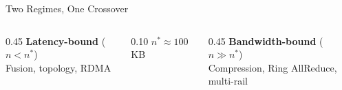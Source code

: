 \documentclass[aspectratio=169, 12pt]{beamer}
\begin{document}
\begin{frame}{Two Regimes, One Crossover}
\vspace{0.1cm}
\small
\begin{columns}[T]
  \begin{column}{0.45\textwidth}
    \centering
    \textcolor{errorstroke}{\textbf{Latency-bound}} ($n < n^*$)\\[0.05cm]
    {\scriptsize Fusion, topology, RDMA}
  \end{column}
  \begin{column}{0.10\textwidth}
    \centering
    {\footnotesize $n^* \!\approx\! 100$ KB}
  \end{column}
  \begin{column}{0.45\textwidth}
    \centering
    \textcolor{datastroke}{\textbf{Bandwidth-bound}} ($n \gg n^*$)\\[0.05cm]
    {\scriptsize Compression, Ring AllReduce, multi-rail}
  \end{column}
\end{columns}

\end{frame}
\end{document}
